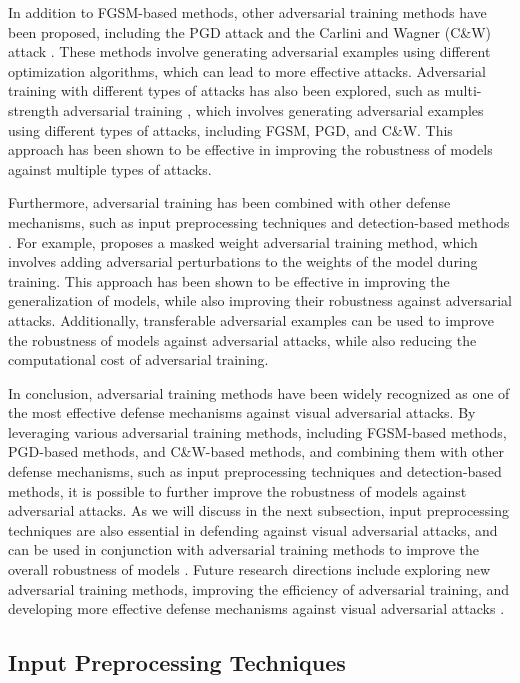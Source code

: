 \documentclass[11pt]{article}
\begin{document}
In addition to FGSM-based methods, other adversarial training methods have been proposed, including the PGD attack \cite{ref97} and the Carlini and Wagner (C\&W) attack \cite{ref99}. These methods involve generating adversarial examples using different optimization algorithms, which can lead to more effective attacks. Adversarial training with different types of attacks has also been explored, such as multi-strength adversarial training \cite{ref100}, which involves generating adversarial examples using different types of attacks, including FGSM, PGD, and C\&W. This approach has been shown to be effective in improving the robustness of models against multiple types of attacks.

Furthermore, adversarial training has been combined with other defense mechanisms, such as input preprocessing techniques and detection-based methods \cite{ref101}. For example, \cite{ref102} proposes a masked weight adversarial training method, which involves adding adversarial perturbations to the weights of the model during training. This approach has been shown to be effective in improving the generalization of models, while also improving their robustness against adversarial attacks. Additionally, transferable adversarial examples \cite{ref103} can be used to improve the robustness of models against adversarial attacks, while also reducing the computational cost of adversarial training.

In conclusion, adversarial training methods have been widely recognized as one of the most effective defense mechanisms against visual adversarial attacks. By leveraging various adversarial training methods, including FGSM-based methods, PGD-based methods, and C\&W-based methods, and combining them with other defense mechanisms, such as input preprocessing techniques and detection-based methods, it is possible to further improve the robustness of models against adversarial attacks. As we will discuss in the next subsection, input preprocessing techniques are also essential in defending against visual adversarial attacks, and can be used in conjunction with adversarial training methods to improve the overall robustness of models \cite{ref104}. Future research directions include exploring new adversarial training methods, improving the efficiency of adversarial training, and developing more effective defense mechanisms against visual adversarial attacks \cite{ref97}.

\subsection{Input Preprocessing Techniques}
\end{document}
